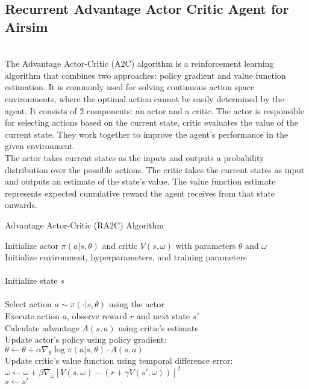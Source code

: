 \documentclass[preprint,12pt]{elsarticle}
\begin{document}
\subsection{Recurrent Advantage Actor Critic Agent for Airsim }\\

The Advantage Actor-Critic (A2C) algorithm is a reinforcement learning algorithm that combines two approaches: policy gradient and value function estimation. It is commonly used for solving continuous action space environments, where the optimal action cannot be easily determined by the agent. It consists of 2 components: an actor and a critic. The actor is responsible for selecting actions based on the current state, critic evaluates the value of the current state. They work together to improve the agent's performance in the given environment.\\
The actor takes current states as the inputs and outputs a probability distribution over the possible actions. The critic takes the current states as input and outputs an estimate of the state's value. The value function estimate represents expected cumulative reward the agent receives from that state onwards.\\
\begin{algorithm}[!htbp]
\caption{Advantage Actor-Critic (RA2C) Algorithm}
\begin{algorithmic}
    \STATE Initialize actor $\pi(a|s,\theta)$ and critic $V(s,\omega)$ with parameters $\theta$ and $\omega$\\
    \STATE Initialize environment, hyperparameters, and training parameters\\
    \\
        \STATE Initialize state $s$\\
        \\
            \STATE Select action $a \sim \pi(\cdot|s,\theta)$ using the actor\\
            \STATE Execute action $a$, observe reward $r$ and next state $s'$\\
            \STATE Calculate advantage $A(s,a)$ using critic's estimate\\
            \STATE Update actor's policy using policy gradient:\\
            \STATE \quad $\theta \leftarrow \theta + \alpha \nabla_\theta \log \pi(a|s,\theta) \cdot A(s,a)$\\
            \STATE Update critic's value function using temporal difference error:\\
            \STATE \quad $\omega \leftarrow \omega + \beta \nabla_\omega [V(s,\omega) - (r + \gamma V(s',\omega))]^2$\\
            \STATE $s \leftarrow s'$\\
        \ENDFOR\\
    \ENDFOR\\
\end{algorithmic}
\end{algorithm}
\end{document}
